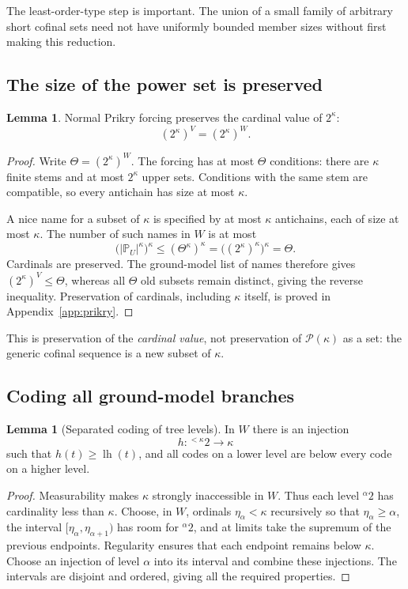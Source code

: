 \documentclass[11pt,letterpaper]{article}
\theoremstyle{definition}
\newtheorem{lemma}[definition]{Lemma}
\numberwithin{equation}{section}
\newcommand{\Pow}{\mathcal P}
\begin{document}
The least-order-type step is important. The union of a small family of arbitrary short cofinal sets need not have uniformly bounded member sizes without first making this reduction.

\subsection{The size of the power set is preserved}

\begin{lemma}\label{lem:power}
Normal Prikry forcing preserves the cardinal value of $2^\kappa$:
\[
 (2^\kappa)^V=(2^\kappa)^W.
\]
\end{lemma}
\begin{proof}
Write $\Theta=(2^\kappa)^W$. The forcing has at most $\Theta$ conditions: there are $\kappa$ finite stems and at most $2^\kappa$ upper sets. Conditions with the same stem are compatible, so every antichain has size at most $\kappa$.

A nice name for a subset of $\kappa$ is specified by at most $\kappa$ antichains, each of size at most $\kappa$. The number of such names in $W$ is at most
\[
 \bigl(|\mathbb P_U|^\kappa\bigr)^\kappa
 \le(\Theta^\kappa)^\kappa
 =\bigl((2^\kappa)^\kappa\bigr)^\kappa
 =\Theta.
\]
Cardinals are preserved. The ground-model list of names therefore gives $(2^\kappa)^V\le\Theta$, whereas all $\Theta$ old subsets remain distinct, giving the reverse inequality. Preservation of cardinals, including $\kappa$ itself, is proved in Appendix~\ref{app:prikry}.
\end{proof}

This is preservation of the \emph{cardinal value}, not preservation of $\Pow(\kappa)$ as a set: the generic cofinal sequence is a new subset of $\kappa$.

\subsection{Coding all ground-model branches}

\begin{lemma}[Separated coding of tree levels]\label{lem:treecode}
In $W$ there is an injection
\[
 h:{}^{<\kappa}2\longrightarrow\kappa
\]
such that $h(t)\ge\operatorname{lh}(t)$, and all codes on a lower level are below every code on a higher level.
\end{lemma}
\begin{proof}
Measurability makes $\kappa$ strongly inaccessible in $W$. Thus each level ${}^\alpha2$ has cardinality less than $\kappa$. Choose, in $W$, ordinals $\eta_\alpha<\kappa$ recursively so that $\eta_\alpha\ge\alpha$, the interval $[\eta_\alpha,\eta_{\alpha+1})$ has room for ${}^\alpha2$, and at limits take the supremum of the previous endpoints. Regularity ensures that each endpoint remains below $\kappa$. Choose an injection of level $\alpha$ into its interval and combine these injections. The intervals are disjoint and ordered, giving all the required properties.
\end{proof}
\end{document}
